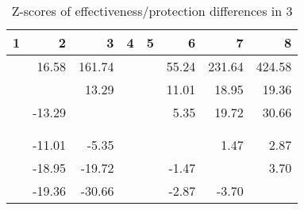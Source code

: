 \begin{table}[ht]
\centering
\begin{tabular}{rrrrrrrr}
  \hline
1 & 2 & 3 & 4 & 5 & 6 & 7 & 8 \\ 
  \hline
 & 16.58 & 161.74 &  &  & 55.24 & 231.64 & 424.58 \\ 
   &  & 13.29 &  &  & 11.01 & 18.95 & 19.36 \\ 
   & -13.29 &  &  &  & 5.35 & 19.72 & 30.66 \\ 
   &  &  &  &  &  &  &  \\ 
   &  &  &  &  &  &  &  \\ 
   & -11.01 & -5.35 &  &  &  & 1.47 & 2.87 \\ 
   & -18.95 & -19.72 &  &  & -1.47 &  & 3.70 \\ 
   & -19.36 & -30.66 &  &  & -2.87 & -3.70 &  \\ 
   \hline
\end{tabular}
\caption{Z-scores of effectiveness/protection differences in  3} 
\end{table}
